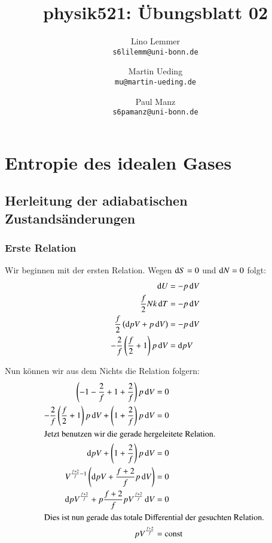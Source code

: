 

\setcounter{section}{1}
\renewcommand\thesection{H\,2.\arabic{section}}
\renewcommand\thesubsection{\thesection.\alph{subsection}}

\title{physik521: Übungsblatt 02}
\author{%
    Lino Lemmer \\ \small{\texttt{s6lilemm@uni-bonn.de}}
    \and
    Martin Ueding \\ \small{\texttt{mu@martin-ueding.de}}
    \and
    Paul Manz \\ \small{\texttt{s6pamanz@uni-bonn.de}}
}


\maketitle
\section{Entropie des idealen Gases}


\subsection{Herleitung der adiabatischen Zustandsänderungen}
\label{ssec:H2.1.a}

\subsubsection{Erste Relation}

Wir beginnen mit der ersten Relation. Wegen $\dif S = 0$ und $\dif N = 0$ folgt:
\begin{align*}
    \dif U &= - p \dif V \\
    \frac f2 N k \dif T &= - p \dif V \\
    \frac f2 \left( \dif p V + p \dif V \right) &= - p \dif V \\
        - \frac 2f \left( \frac f2 + 1 \right) p \dif V &= \dif p V
\end{align*}

Nun können wir aus dem Nichts die Relation folgern:
\begin{align*}
    \left( -1 - \frac 2f + 1 + \frac 2f \right) p \dif V &= 0 \\
    - \frac 2f \left( \frac f2 + 1 \right) p \dif V + \left( 1 + \frac 2f \right) p \dif V &= 0 \\
    \intertext{%
        Jetzt benutzen wir die gerade hergeleitete Relation.
    }
    \dif p V + \left( 1 + \frac 2f \right) p \dif V &= 0 \\
    V^{\frac{f+2}f -1} \left( \dif p V + \frac{f+2}f p \dif V \right) &= 0 \\
    \dif p V^{\frac{f+2}f} + p \frac{f+2}f p V^{\frac{f+2}f} \dif V &= 0 \\
    \intertext{%
        Dies ist nun gerade das totale Differential der
        gesuchten Relation.
    }
    p V^{\frac{f+2}f} &= \text{const}
\end{align*}

